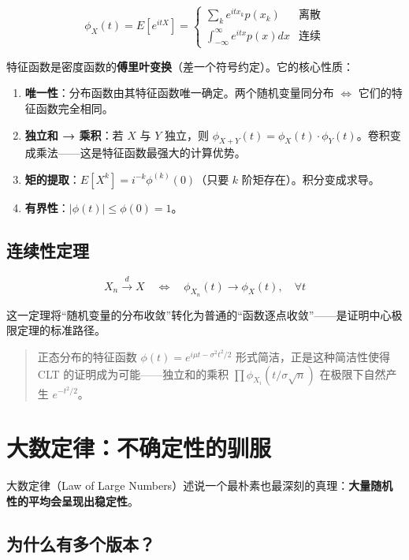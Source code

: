 \documentclass[
]{book}
\providecommand{\tightlist}{%
  \setlength{\itemsep}{0pt}\setlength{\parskip}{0pt}}
\begin{document}
\[\phi_X(t) = E[e^{itX}] = \begin{cases} \sum_k e^{itx_k} p(x_k) & \text{离散} \\ \int_{-\infty}^{\infty} e^{itx} p(x) dx & \text{连续} \end{cases}\]

特征函数是密度函数的\textbf{傅里叶变换}（差一个符号约定）。它的核心性质：

\begin{enumerate}
\def\labelenumi{\arabic{enumi}.}
\tightlist
\item
  \textbf{唯一性}：分布函数由其特征函数唯一确定。两个随机变量同分布 \(\Leftrightarrow\) 它们的特征函数完全相同。
\item
  \textbf{独立和 → 乘积}：若 \(X\) 与 \(Y\) 独立，则 \(\phi_{X+Y}(t) = \phi_X(t) \cdot \phi_Y(t)\)。卷积变成乘法------这是特征函数最强大的计算优势。
\item
  \textbf{矩的提取}：\(E[X^k] = i^{-k} \phi^{(k)}(0)\)（只要 \(k\) 阶矩存在）。积分变成求导。
\item
  \textbf{有界性}：\(|\phi(t)| \leq \phi(0) = 1\)。
\end{enumerate}

\subsection{连续性定理}\label{ux8fdeux7eedux6027ux5b9aux7406}

\[X_n \xrightarrow{d} X \quad \Leftrightarrow \quad \phi_{X_n}(t) \to \phi_X(t), \quad \forall t\]

这一定理将``随机变量的分布收敛''转化为普通的``函数逐点收敛''------是证明中心极限定理的标准路径。

\begin{quote}
正态分布的特征函数 \(\phi(t) = e^{i\mu t - \sigma^2 t^2 / 2}\) 形式简洁，正是这种简洁性使得 CLT 的证明成为可能------独立和的乘积 \(\prod \phi_{X_i}(t/\sigma\sqrt{n})\) 在极限下自然产生 \(e^{-t^2/2}\)。
\end{quote}

\section{大数定律：不确定性的驯服}\label{ux5927ux6570ux5b9aux5f8bux4e0dux786eux5b9aux6027ux7684ux9a6fux670d}

大数定律（Law of Large Numbers）述说一个最朴素也最深刻的真理：\textbf{大量随机性的平均会呈现出稳定性}。

\subsection{为什么有多个版本？}\label{ux4e3aux4ec0ux4e48ux6709ux591aux4e2aux7248ux672c}
\end{document}
